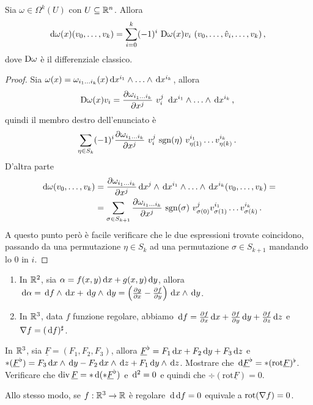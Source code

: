 \begin{corollary} %
	Sia $\omega \in \Omega^k(U)$ con $U\subseteq \mathbb R^n$. Allora
	\begin{equation*}
		\,\mathrm d \omega (x) (v_0,\ldots,v_k) = \sum_{i=0}^k (-1)^i\ \mathrm D \omega (x) v_i\ (v_0,\ldots,\hat v_i, \ldots, v_k)\, \text{, }
	\end{equation*}
	dove $\mathrm D \omega$ è il differenziale classico.
\end{corollary}
\begin{proof}
	Sia $\omega(x) = \omega_{i_1 \ldots  i_{k}} (x) \,\mathrm d x^{i_1}\wedge\ldots\wedge \,\mathrm d x^{i_k}$, allora
	\begin{equation*}
		\mathrm D \omega(x) v_i = \frac{\partial \omega_{i_1 \ldots  i_{k}}}{\partial x^j}\ v_i^j\ \,\mathrm d x^{i_1}\wedge\ldots\wedge \,\mathrm d x^{i_k} \, \text{, }
	\end{equation*}
	quindi il membro destro dell'enunciato è
	\begin{equation*}
		\sum_{\eta\in S_k}(-1)^i \DerParz{\omega_{\seqb ik{}}}{x^j}\ v_i^j\ \sgn(\eta)\ v_{\eta(1)}^{i_1} \ldots v_{\eta(k)}^{i_k} \punto
	\end{equation*}
	D'altra parte
	\begin{align*}
		\,\mathrm d \omega (v_0,\ldots,v_k) &= \frac{\partial \omega_{i_1 \ldots  i_{k}}}{\partial x^j} \,\mathrm d x^j \wedge \,\mathrm d x^{i_1}\wedge\ldots\wedge \,\mathrm d x^{i_k} (v_0,\ldots,v_k)= \\ 
		&=\sum_{\sigma \in S_{k+1}}\frac{\partial \omega_{i_1 \ldots  i_{k}}}{\partial x^j}\ \mathrm{sgn}(\sigma)\ v_{\sigma(0)}^{j} v_{\sigma(1)}^{i_1} \ldots v_{\sigma(k)}^{i_k} \, \text{. }
	\end{align*}
	A questo punto però è facile verificare che le due espressioni trovate coincidono, passando da una permutazione $\eta \in S_k$ ad una permutazione $\sigma \in S_{k+1}$ mandando lo 0 in $i$.
\end{proof}

\begin{example}
	\begin{enumerate}
	 \item In $\mathbb R^2$, sia $\alpha = f(x,y) \,\mathrm d x + g(x,y) \,\mathrm d y$, allora $\,\mathrm d \alpha= \,\mathrm d f\wedge \,\mathrm d x + \,\mathrm d g \wedge \,\mathrm d y = \left(\frac{\partial g}{\partial x} - \frac{\partial f}{\partial y}\right) \,\mathrm d x\wedge \,\mathrm d y $.
	 \item In $\mathbb R^3$, data $f$ funzione regolare, abbiamo $\,\mathrm d f = \frac{\partial f}{\partial x} \,\mathrm d x + \frac{\partial f}{\partial y} \,\mathrm d y + \frac{\partial f}{\partial z} \,\mathrm d z$ e $\nabla f = (\,\mathrm d f)^\sharp$.
	\end{enumerate}
\end{example}

\begin{exercise} %
	In $\mathbb R^3$, sia $\underline F=(F_1,F_2,F_3)$, allora $\underline F^\flat = F_1 \,\mathrm d x + F_2 \,\mathrm d y + F_3 \,\mathrm d z$ e
	$*(\underline F^\flat) = F_3\,\mathrm d x \wedge \,\mathrm d y - F_2 \,\mathrm d x \wedge \,\mathrm d z + F_1 \,\mathrm d y \wedge \,\mathrm d z$.
	Mostrare che $\,\mathrm d \underline{F}^\flat = *(\mathrm{rot} \underline{F})^\flat$.	
	Verificare che $\operatorname{div} \underline F = *\,\mathrm d(* \underline F^\flat)$ e $\,\mathrm d^2 = 0$ e quindi che $\div (\mathrm{rot} \underline F)=0$.
	
	Allo stesso modo, se $f:\mathbb R^3\to\mathbb R$ è regolare $\,\mathrm d\,\mathrm d f=0$ equivale a $\mathrm{rot}(\nabla f)=0$.
\end{exercise}




